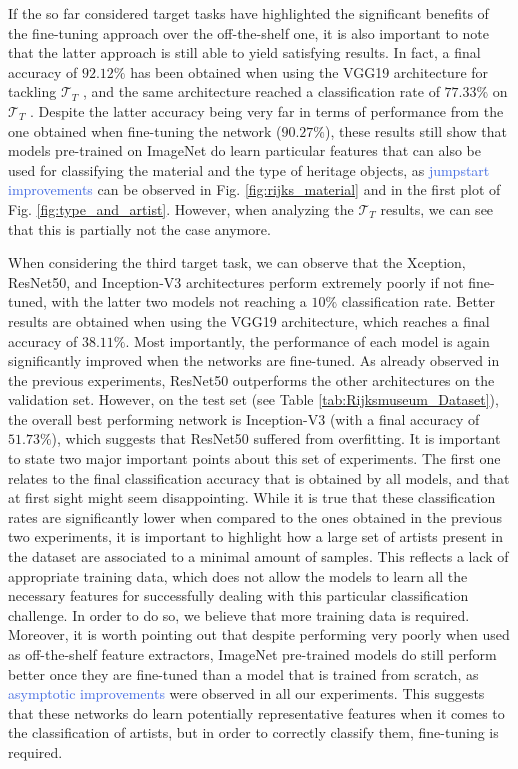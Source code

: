 If the so far considered target tasks have highlighted the significant benefits of the fine-tuning approach over the off-the-shelf one, it is also important to note that the latter approach is still able to yield satisfying results. In fact, a final accuracy of $92.12\%$ has been obtained when using the VGG19 architecture for tackling $\mathcal{T}_T$ , and the same architecture reached a classification rate of $77.33\%$ on $\mathcal{T}_T$ . Despite the latter accuracy being very far in terms of performance from the one obtained when fine-tuning the network ($90.27\%$), these results still show that models pre-trained on ImageNet do learn particular features that can also be used for classifying the material and the type of heritage objects, as \textcolor{RoyalBlue}{jumpstart improvements} can be observed in Fig. \ref{fig:rijks_material} and in the first plot of Fig. \ref{fig:type_and_artist}.  However, when analyzing the $\mathcal{T}_T$  results, we can see that this is partially not the case anymore.




When considering the third target task, we can observe that the Xception, ResNet50, and Inception-V3 architectures perform extremely poorly if not fine-tuned, with the latter two models not reaching a $10\%$ classification rate. Better results are obtained when using the VGG19 architecture, which reaches a final accuracy of $38.11\%$. Most importantly, the performance of each model is again significantly improved when the networks are fine-tuned. As already observed in the previous experiments, ResNet50 outperforms the other architectures on the validation set. However, on the test set (see Table \ref{tab:Rijksmuseum_Dataset}), the overall best performing network is Inception-V3 (with a final accuracy of $51.73\%$), which suggests that ResNet50 suffered from overfitting. It is important to state two major important points about this set of experiments. The first one relates to the final classification accuracy that is obtained by all models, and that at first sight might seem disappointing. While it is true that these classification rates are significantly lower when compared to the ones obtained in the previous two experiments, it is important to highlight how a large set of artists present in the dataset are associated to a minimal amount of samples. This reflects a lack of appropriate training data, which does not allow the models to learn all the necessary features for successfully dealing with this particular classification challenge. In order to do so, we believe that more training data is required. Moreover, it is worth pointing out that despite performing very poorly when used as off-the-shelf feature extractors, ImageNet pre-trained models do still perform better once they are fine-tuned than a model that is trained from scratch, as \textcolor{RoyalBlue}{asymptotic improvements} were observed in all our experiments. This suggests that these networks do learn potentially representative features when it comes to the classification of artists, but in order to correctly classify them, fine-tuning is required.

